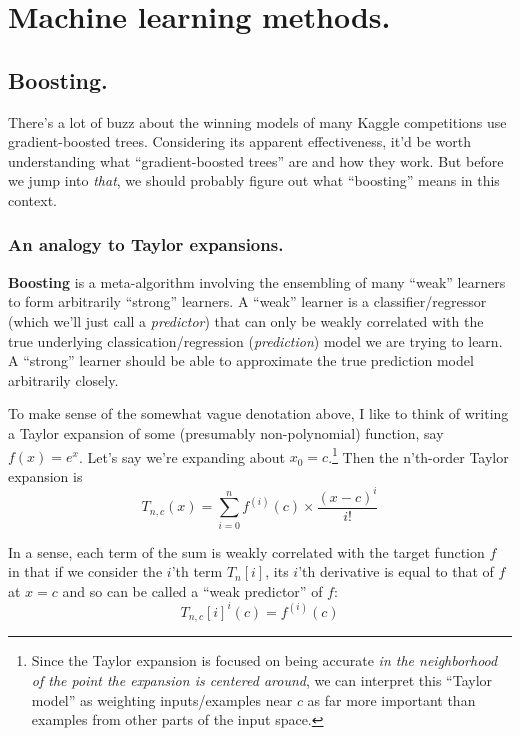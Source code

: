 \documentclass[letterpaper,12pt]{report}
\begin{document}
\newpage


\chapter{Machine learning methods.}\label{machine-learning-methods}



\section{Boosting.}\label{boosting}

There's a lot of buzz about the winning models of many Kaggle competitions 
use gradient-boosted trees. Considering its apparent effectiveness, it'd be worth understanding
what ``gradient-boosted trees'' are and how they work. But before we jump into \emph{that}, 
we should probably figure out what ``boosting'' means in this context.

\subsection{An analogy to Taylor expansions.}


\textbf{Boosting} is a meta-algorithm involving
the ensembling of many ``weak'' learners to form arbitrarily ``strong'' learners.
A ``weak'' learner is a classifier/regressor (which we'll just call a \emph{predictor}) 
that can only be weakly correlated with the true underlying 
classication/regression (\emph{prediction}) model we are trying to 
learn. A ``strong'' learner should be able to approximate the true prediction model
arbitrarily closely.

To make sense of the somewhat vague denotation above, 
I like to think of writing a Taylor expansion of some (presumably non-polynomial)
function, say \(f(x) = e^x\). Let's say we're expanding about \(x_0 = c\).\footnote{
  Since the Taylor expansion is focused on being accurate
  \emph{in the neighborhood of the point the expansion is centered around}, 
  we can interpret this ``Taylor model'' as weighting inputs/examples near \(c\) 
  as far more important than examples from other parts of the input space.
} 
Then the n'th-order Taylor expansion is
\[ T_{n,c}(x) = \sum_{i=0}^{n} f^{(i)}(c) \times \frac{(x-c)^i}{i!}\]

In a sense, each term of the sum is weakly correlated with the target function $f$ in that
if we consider the \(i\)'th term \(T_n[i]\), its \(i\)'th derivative is equal to 
that of \(f\) at \(x = c\) and so can be called a ``weak predictor'' of \(f\):
\[T_{n,c}[i]^{{i}}(c) = f^{(i)}(c) \]
\end{document}
